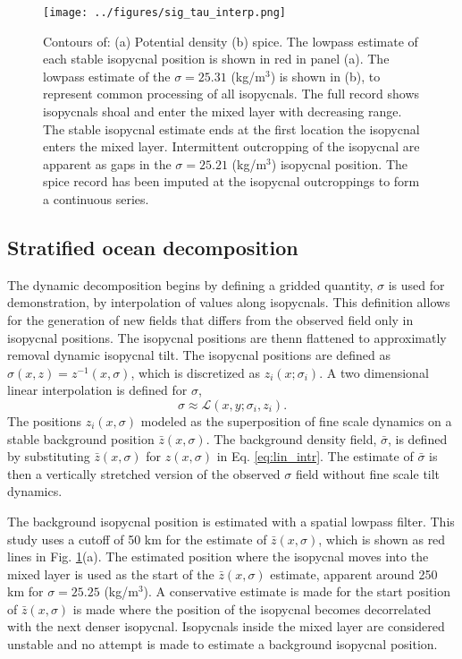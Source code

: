 \documentclass[preprint,NumberedRefs]{JASA}
\begin{document}
\begin{figure}
\texttt{[image: ../figures/sig\_tau\_interp.png]}
    \caption{\label{fig:cntrs}{Contours of: (a) Potential density (b) spice. The lowpass estimate of each stable isopycnal position is shown in red in panel (a). The lowpass estimate of the $\sigma=25.31$ (kg/m$^3$) is shown in (b), to represent common processing of all isopycnals. The full record shows isopycnals shoal and enter the mixed layer with decreasing range. The stable isopycnal estimate ends at the first location the isopycnal enters the mixed layer. Intermittent outcropping of the isopycnal are apparent as gaps in the $\sigma=25.21$ (kg/m$^3$) isopycnal position. The spice record has been imputed at the isopycnal outcroppings to form a continuous series.}}
\end{figure}

\subsection{Stratified ocean decomposition}
The dynamic decomposition begins by defining a gridded quantity, $\sigma$ is used for demonstration, by interpolation of values along isopycnals. This definition allows for the generation of new fields that differs from the observed field only in isopycnal positions. The isopycnal positions are thenn flattened to approximatly removal dynamic isopycnal tilt. The isopycnal positions are defined as $\sigma(x, z) = z^{-1}(x, \sigma)$, which is discretized as $z_i(x; \sigma_i)$. A two dimensional linear interpolation is defined for $\sigma$,
\begin{equation}
    \sigma\approx\mathcal{L}(x, y; \sigma_i, z_i).
    \label{eq:lin_intr}
\end{equation}
The positions $z_i(x, \sigma)$ modeled as the superposition of fine scale dynamics on a stable background position $\bar{z}(x, \sigma)$. The background density field, $\bar{\sigma}$, is defined by substituting $\bar{z}(x, \sigma)$ for $z(x, \sigma)$ in Eq. \eqref{eq:lin_intr}. The estimate of $\bar{\sigma}$ is then a vertically stretched version of the observed $\sigma$ field without fine scale tilt dynamics.

The background isopycnal position is estimated with a spatial lowpass filter. This study uses a cutoff of 50 km for the estimate of $\bar{z}(x, \sigma)$, which is shown as red lines in Fig. \ref{fig:cntrs}(a). The estimated position where the isopycnal moves into the mixed layer is used as the start of the $\bar{z}(x, \sigma)$ estimate, apparent around 250 km for $\sigma=25.25$ (kg/m$^3$). A conservative estimate is made for the start position of $\bar{z}(x, \sigma)$ is made where the position of the isopycnal becomes decorrelated with the next denser isopycnal. Isopycnals inside the mixed layer are considered unstable and no attempt is made to estimate a background isopycnal position.
\end{document}
